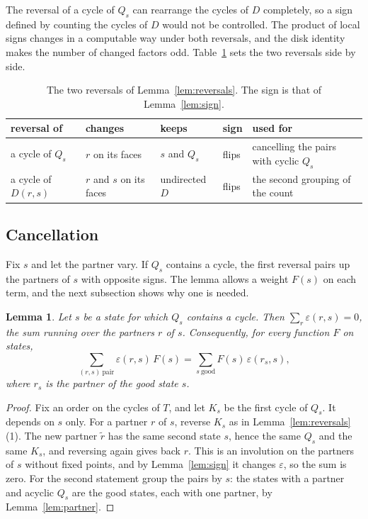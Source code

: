 \documentclass[10pt]{amsart}
\numberwithin{equation}{section}
\newtheorem{lemma}[equation]{Lemma}
\theoremstyle{definition}
\theoremstyle{remark}
\newcommand{\T}{T}
\newcommand{\eps}{\varepsilon}
\begin{document}
The reversal of a cycle of $Q_s$ can rearrange the cycles of $D$ completely, so a sign defined by counting the cycles of $D$ would not be controlled.
The product of local signs changes in a computable way under both reversals, and the disk identity makes the number of changed factors odd.
Table~\ref{tab:reversals} sets the two reversals side by side.

\begin{table}[H]
\centering
\begin{tabular}{@{}lllll@{}}
\toprule
reversal of & changes & keeps & sign & used for\\
\midrule
a cycle of $Q_s$ & $r$ on its faces & $s$ and $Q_s$ & flips & cancelling the pairs with cyclic $Q_s$\\
a cycle of $D(r,s)$ & $r$ and $s$ on its faces & undirected $D$ & flips & the second grouping of the count\\
\bottomrule
\end{tabular}
\vspace{4pt}
\caption{The two reversals of Lemma~\ref{lem:reversals}. The sign is that of Lemma~\ref{lem:sign}.}
\label{tab:reversals}
\end{table}

\subsection*{Cancellation}
Fix $s$ and let the partner vary.
If $Q_s$ contains a cycle, the first reversal pairs up the partners of $s$ with opposite signs.
The lemma allows a weight $F(s)$ on each term, and the next subsection shows why one is needed.

\begin{lemma}\label{lem:cancel}
Let $s$ be a state for which $Q_s$ contains a cycle.
Then $\sum_r\eps(r,s)=0$, the sum running over the partners $r$ of $s$.
Consequently, for every function $F$ on states,
\[
\sum_{(r,s)\ \text{pair}}\eps(r,s)\,F(s)=\sum_{s\ \text{good}}F(s)\,\eps(r_s,s),
\]
where $r_s$ is the partner of the good state $s$.
\end{lemma}

\begin{proof}
Fix an order on the cycles of $\T$, and let $K_s$ be the first cycle of $Q_s$. It depends on $s$ only.
For a partner $r$ of $s$, reverse $K_s$ as in Lemma~\ref{lem:reversals}(1).
The new partner $\tilde r$ has the same second state $s$, hence the same $Q_s$ and the same $K_s$, and reversing again gives back $r$.
This is an involution on the partners of $s$ without fixed points, and by Lemma~\ref{lem:sign} it changes $\eps$, so the sum is zero.
For the second statement group the pairs by $s$: the states with a partner and acyclic $Q_s$ are the good states, each with one partner, by Lemma~\ref{lem:partner}.
\end{proof}
\end{document}
